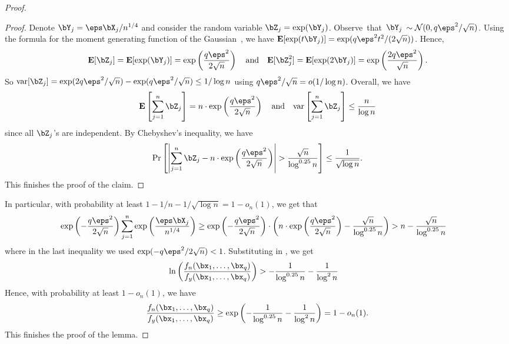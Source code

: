 \begin{proof}
\begin{proof} Denote $\bY_j = \eps \bX_j/n^{1/4}$ and consider the random variable $\bZ_j = \exp(\bY_j)$. 
Observe~that~$\bY_j$ $\sim \cN(0, q\eps^2/\sqrt{n})$. Using the formula for the moment generating function
    of the Gaussian~\cite{gaussian-wiki}, we have $\EX[\exp(t\bY_j)] = \exp(q\eps^2 t^2/(2\sqrt{n}))$.
Hence, $$\EX[\bZ_j] = \EX[\exp(\bY_j)] = \exp\left(\frac{q\eps^2}{2\sqrt{n}}\right)\quad\text{and}\quad \EX[\bZ^2_j] = \EX[\exp(2\bY_j)] = \exp\left(\frac{2q\eps^2}{\sqrt{n}}\right).$$
So $\textrm{var}[\bZ_j] = \exp(2q\eps^2/\sqrt{n}) - \exp(q\eps^2/\sqrt{n})\leq 1/\log n$ using  $q\eps^2/\sqrt{n} = o (1/\log n)$.
Overall, we have 
$$\EX\left[\sum_{j=1}^n \bZ_j\right] = n\cdot \exp\left(\frac{q\eps^2}{ 2\sqrt{n}}\right)\quad\text{and}\quad\var\left[\sum_{j=1}^n \bZ_j\right] \leq \frac{n}{\log n}$$ since
all $\bZ_j$'s are independent. By Chebyshev's inequality, we have 
$$\Pr\left[\left|\sum_{j=1}^n \bZ_j - n\cdot \exp\left(\frac{q\eps^2}{2\sqrt{n}}\right)\right| > \frac{\sqrt{n}}{\log^{0.25} n}\right] \leq \frac{1}{\sqrt{\log n}}.$$
This finishes the proof of the claim.
\end{proof}

In particular, with probability at least $1-1/n - 1/\sqrt{\log n} = 1-o_n(1)$, we get that
\begin{align*}
\exp\left(-\frac{q \eps^2}{2\sqrt{n}}\right) \sum_{j=1}^n \exp\left(\frac{\eps \bX_j}{n^{1/4}}\right) & \geq \exp\left(-\frac{q \eps^2}{2\sqrt{n}}\right)\cdot \left( n \cdot \exp\left(\frac{q \eps^2}{2\sqrt{n}}\right) - \frac{\sqrt{n}}{\log^{0.25} n}\right)  >  n - \frac{\sqrt{n}}{\log^{0.25} n} 
    \end{align*}
where in the last inequality we used $\exp(-q \eps^2/2\sqrt{n}) < 1$. Substituting in , we get
\begin{align}
\ln\left(\frac{f_n(\bx_1, \ldots, \bx_q)}{f_y(\bx_1,  \ldots, \bx_q)} \right)
& > -\frac{ 1}{    \log^{0.25} n}  - \frac{1}{\log^2 n} \label{eq:18}
\end{align}
Hence, with probability at least $1-o_n(1)$,  we have
$$\frac{f_n(\bx_1,  \ldots, \bx_q)}{f_y(\bx_1, \ldots, \bx_q)} \geq \exp\left(-\frac{ 1}{ \log^{0.25} n} - \frac{1}{\log^2n}\right) = 1-o_n(1).$$
This finishes the proof of the lemma.
\end{proof}

